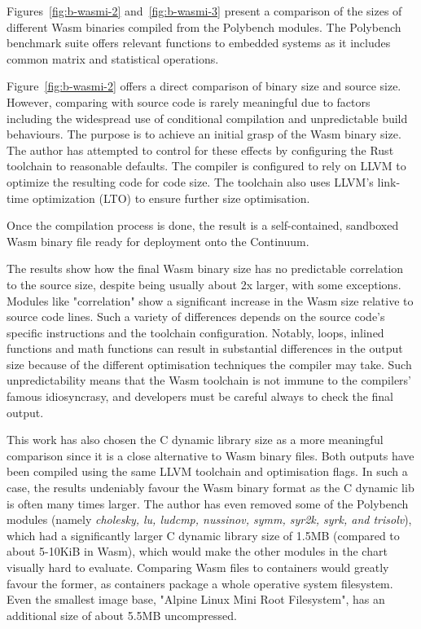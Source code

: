Figures~\ref{fig:b-wasmi-2} and~\ref{fig:b-wasmi-3} present a comparison of the sizes of different Wasm binaries compiled from the Polybench \cite{yuki2014understanding} modules. The Polybench benchmark suite offers relevant functions to embedded systems as it includes common matrix and statistical operations.

{\color{red}
Figure~\ref{fig:b-wasmi-2} offers a direct comparison of binary size and source size. However, comparing with source code is rarely meaningful due to factors including the widespread use of conditional compilation and unpredictable build behaviours. The purpose is to achieve an initial grasp of the Wasm binary size. The author has attempted to control for these effects by configuring the Rust toolchain to reasonable defaults. The compiler is configured to rely on LLVM to optimize the resulting code for code size. The toolchain also uses LLVM's link-time optimization (LTO) to ensure further size optimisation.

Once the compilation process is done, the result is a self-contained, sandboxed Wasm binary file ready for deployment onto the Continuum.

The results show how the final Wasm binary size has no predictable correlation to the source size, despite being usually about 2x larger, with some exceptions. Modules like "correlation" show a significant increase in the Wasm size relative to source code lines. Such a variety of differences depends on the source code's specific instructions and the toolchain configuration. Notably, loops, inlined functions and math functions can result in substantial differences in the output size because of the different optimisation techniques the compiler may take. Such unpredictability means that the Wasm toolchain is not immune to the compilers' famous idiosyncrasy, and developers must be careful always to check the final output.
}

This work has also chosen the C dynamic library size as a more meaningful comparison since it is a close alternative to Wasm binary files. Both outputs have been compiled using the same LLVM toolchain and optimisation flags. In such a case, the results undeniably favour the Wasm binary format as the C dynamic lib is often many times larger. The author has even removed some of the Polybench modules (namely \emph{cholesky, lu, ludcmp, nussinov, symm, syr2k, syrk, and trisolv}), which had a significantly larger C dynamic library size of 1.5MB (compared to about 5-10KiB in Wasm), which would make the other modules in the chart visually hard to evaluate. Comparing Wasm files to containers would greatly favour the former, as containers package a whole operative system filesystem. Even the smallest image base, "Alpine Linux Mini Root Filesystem", has an additional size of about 5.5MB uncompressed.


